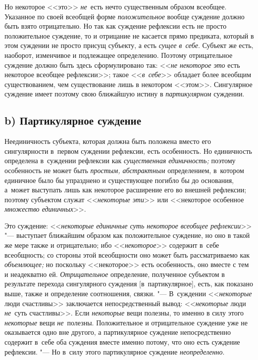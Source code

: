 Но некоторое <<это>> {\em не}~есть нечто существенным образом всеобщее.
Указанное по своей всеобщей форме {\em положительное}
вообще суждение должно быть взято отрицательно. Но так как
суждение рефлексии есть не просто положительное суждение, то и отрицание не
касается прямо предиката, который в этом суждении не просто присущ
субъекту, а есть {\em сущее в~себе}.
Субъект же есть, наоборот, изменчивое и подлежащее
определению. Поэтому отрицательное суждение должно быть здесь
сформулировано так: <<{\em не некоторое это} есть некоторое всеобщее
рефлексии>>; такое <<{\em в~себе}>>
обладает более всеобщим существованием, чем существование
лишь в некотором <<этом>>. Сингулярное суждение имеет поэтому свою ближайшую
истину в {\em партикулярном} суждении.

\subsection[b) Партикулярное суждение]{b) Партикулярное суждение}

Неединичность субъекта, которая должна быть положена вместо его сингулярности
в~первом суждении рефлексии, есть особенность. Но единичность определена
в~суждении рефлексии как {\em существенная единичность;} поэтому особенность не
может быть {\em простым, абстрактным} определением, в~котором единичное
было бы упразднено и существующее погибло бы до основания, а~может выступать
лишь как некоторое расширение его во внешней рефлексии; поэтому субъектом
служат <<{\em некоторые эти}>> или <<некоторое особенное
{\em множество единичных}>>.

Это суждение: <<{\em некоторые единичные суть некоторое всеобщее рефлексии}>>
"--- выступает ближайшим образом как положительное суждение, но оно в такой же
мере также и отрицательно; ибо <<{\em некоторое}>> содержит в~себе всеобщность;
со стороны этой всеобщности оно может быть рассматриваемо как {\em объемлющее;}
но поскольку <<некоторое>> есть особенность, оно вместе с тем и неадекватно ей.
{\em Отрицательное} определение, полученное субъектом в результате перехода
сингулярного суждения [в~партикулярное], есть, как показано выше, также и
определение соотношения, связки. "--- В~суждении <<{\em некоторые} люди
счастливы>> заключается непосредственный вывод: <<{\em некоторые} люди
{\em не}~суть счастливы>>. Если {\em некоторые} вещи полезны, то именно в силу
этого {\em некоторые} вещи {\em не}~полезны. Положительное и отрицательное
суждение уже не оказывается одно вне другого, а партикулярное суждение
непосредственно содержит в~себе оба суждения вместе именно потому, что
оно есть суждение рефлексии. "--- Но в~силу этого партикулярное суждение
{\em неопределенно}.

